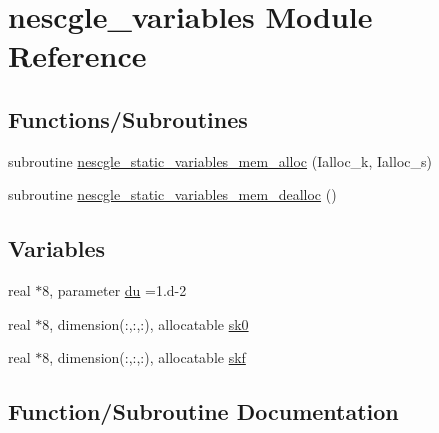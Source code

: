 \hypertarget{namespacenescgle__variables}{}\section{nescgle\+\_\+variables Module Reference}
\label{namespacenescgle__variables}
\subsection*{Functions/\+Subroutines}
\begin{DoxyCompactItemize}
\item 
subroutine \hyperlink{namespacenescgle__variables_a0023aa1810519536d79cdfd9c1106ddd}{nescgle\+\_\+static\+\_\+variables\+\_\+mem\+\_\+alloc} (Ialloc\+\_\+k, Ialloc\+\_\+s)
\item 
subroutine \hyperlink{namespacenescgle__variables_a19bc97e5437e17b707c19cdd197a1fa8}{nescgle\+\_\+static\+\_\+variables\+\_\+mem\+\_\+dealloc} ()
\end{DoxyCompactItemize}
\subsection*{Variables}
\begin{DoxyCompactItemize}
\item 
real $\ast$8, parameter \hyperlink{namespacenescgle__variables_ab14faa799c9e46997e24517681585bc2}{du} =1.d-\/2
\item 
real $\ast$8, dimension(\+:,\+:,\+:), allocatable \hyperlink{namespacenescgle__variables_a048c355abe51e4b0aee3f618d9a67caf}{sk0}
\item 
real $\ast$8, dimension(\+:,\+:,\+:), allocatable \hyperlink{namespacenescgle__variables_af17f5ac212eaac0b60106deab33ab8af}{skf}
\end{DoxyCompactItemize}


\subsection{Function/\+Subroutine Documentation}

